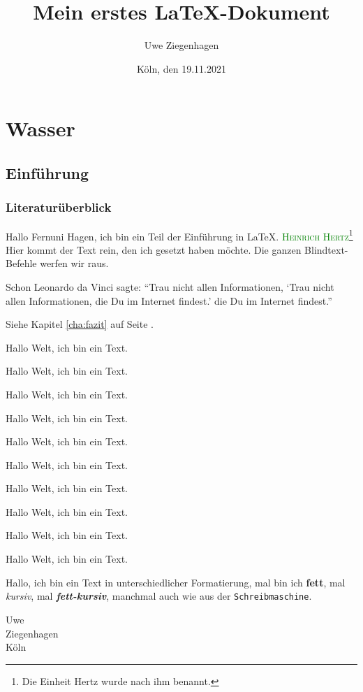 \documentclass[12pt,ngerman,parskip=full]{scrreprt}
\author{Uwe Ziegenhagen}
\title{Mein erstes \LaTeX-Dokument}
\date{Köln, den 19.11.2021}
\newcommand{\person}[1]{\textsc{\textcolor{green}{#1}}}
\begin{document}
\maketitle

\tableofcontents

\chapter{Wasser}

\section{Einführung}
\subsection{Literaturüberblick}

Hallo Fernuni Hagen, ich bin ein Teil der Einführung in \LaTeX. \person{Heinrich Hertz}\footnote{Die Einheit Hertz wurde nach ihm benannt.}
Hier kommt der Text rein, den ich gesetzt haben möchte. 
Die ganzen Blindtext-Befehle werfen wir raus. 

Schon Leonardo da Vinci sagte: \enquote{Trau nicht allen Informationen, \enquote{Trau nicht allen Informationen, die Du im Internet findest.} die Du im Internet findest.}

Siehe Kapitel \ref{cha:fazit} auf Seite \pageref{cha:fazit}.

{\tiny Hallo Welt, ich bin ein Text.}

{\scriptsize Hallo Welt, ich bin ein Text.}

{\footnotesize Hallo Welt, ich bin ein Text.}

{\small Hallo Welt, ich bin ein Text.}

{\normalsize Hallo Welt, ich bin ein Text.}

{\large Hallo Welt, ich bin ein Text.}

{\Large Hallo Welt, ich bin ein Text.}

{\LARGE Hallo Welt, ich bin ein Text.}

{\huge Hallo Welt, ich bin ein Text.}

{\Huge Hallo Welt, ich bin ein Text.}

Hallo, ich bin ein Text in unterschiedlicher Formatierung, mal bin ich \textbf{fett}, mal \textit{kursiv}, mal \textbf{\textit{fett-kursiv}}, manchmal auch wie aus der \texttt{Schreibmaschine}. 

Uwe \\ Ziegenhagen \\ Köln
\end{document}
